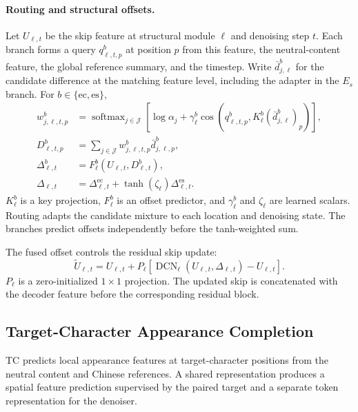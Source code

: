 \documentclass{article}
\begin{document}
\paragraph{Routing and structural offsets.}
Let $U_{\ell,t}$ be the skip feature at structural module $\ell$ and denoising step $t$.
Each branch forms a query $q^b_{\ell,t,p}$ at position $p$ from this feature, the neutral-content feature, the global reference summary, and the timestep.
Write $\bar d^b_{j,\ell}$ for the candidate difference at the matching feature level, including the adapter in the $E_s$ branch.
For $b\in\{\mathrm{ec},\mathrm{es}\}$,
\begin{equation}
\begin{aligned}
w^b_{j,\ell,t,p}
&=
\operatorname{softmax}_{j\in\mathcal J}\!\left[
    \log\alpha_j
    +\gamma^b_\ell
    \cos\!\left(
        q^b_{\ell,t,p},
        K^b_\ell(\bar d^b_{j,\ell})_p
    \right)
\right],\\
D^b_{\ell,t,p}
&=
\sum_{j\in\mathcal J}
w^b_{j,\ell,t,p}\bar d^b_{j,\ell,p},\\
\Delta^b_{\ell,t}
&=
F^b_\ell(U_{\ell,t},D^b_{\ell,t}),\\
\Delta_{\ell,t}
&=
\Delta^{\mathrm{ec}}_{\ell,t}
+\tanh(\zeta_\ell)\Delta^{\mathrm{es}}_{\ell,t}.
\end{aligned}
\label{eq:crp}
\end{equation}
$K^b_\ell$ is a key projection, $F^b_\ell$ is an offset predictor, and $\gamma^b_\ell$ and $\zeta_\ell$ are learned scalars.
Routing adapts the candidate mixture to each location and denoising state.
The branches predict offsets independently before the tanh-weighted sum.

The fused offset controls the residual skip update:
\begin{equation}
\widetilde U_{\ell,t}
=
U_{\ell,t}
+
P_\ell\!\left[
    \operatorname{DCN}_\ell(U_{\ell,t},\Delta_{\ell,t})
    -U_{\ell,t}
\right].
\label{eq:skip}
\end{equation}
$P_\ell$ is a zero-initialized $1\times1$ projection.
The updated skip is concatenated with the decoder feature before the corresponding residual block.


\subsection{Target-Character Appearance Completion}
\label{sec:tc}

TC predicts local appearance features at target-character positions from the neutral content and Chinese references.
A shared representation produces a spatial feature prediction supervised by the paired target and a separate token representation for the denoiser.
\end{document}
